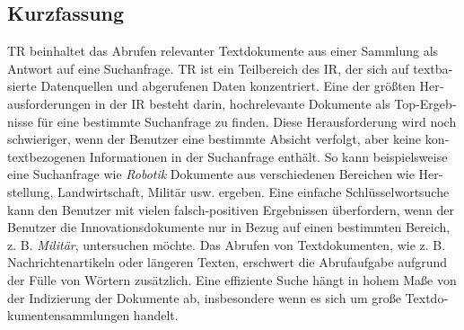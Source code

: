 
\begin{otherlanguage}{ngerman}
    \section*{Kurzfassung}
 \ac{TR} beinhaltet das Abrufen relevanter Textdokumente aus einer Sammlung als Antwort auf eine Suchanfrage. \ac{TR} ist ein Teilbereich des \ac{IR}, der sich auf textbasierte Datenquellen und abgerufenen Daten konzentriert. Eine der größten Herausforderungen in der IR besteht darin, hochrelevante Dokumente als Top-Ergebnisse für eine bestimmte Suchanfrage zu finden. Diese Herausforderung wird noch schwieriger, wenn der Benutzer eine bestimmte Absicht verfolgt, aber keine kontextbezogenen Informationen in der Suchanfrage enthält. So kann beispielsweise eine Suchanfrage wie \emph{Robotik} Dokumente aus verschiedenen Bereichen wie Herstellung, Landwirtschaft, Militär usw. ergeben. Eine einfache Schlüsselwortsuche kann den Benutzer mit vielen falsch-positiven Ergebnissen überfordern, wenn der Benutzer die Innovationsdokumente nur in Bezug auf einen bestimmten Bereich, z. B. \emph{Militär}, untersuchen möchte. Das Abrufen von Textdokumenten, wie z. B. Nachrichtenartikeln oder längeren Texten, erschwert die Abrufaufgabe aufgrund der Fülle von Wörtern zusätzlich. Eine effiziente Suche hängt in hohem Maße von der Indizierung der Dokumente ab, insbesondere wenn es sich um große Textdokumentensammlungen handelt.


\end{otherlanguage}
